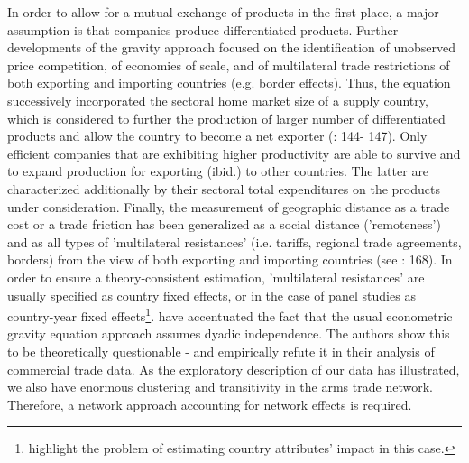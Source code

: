 \documentclass[12pt, letterpaper]{article}
\numberwithin{equation}{section}
\begin{document}
In order to allow for a mutual exchange of products in the first place, a major assumption is that companies produce differentiated products. Further developments of the gravity approach focused on the identification of unobserved price competition, of economies of scale, and of multilateral trade restrictions of both exporting and importing countries (e.g. border effects). Thus, the equation successively incorporated the sectoral home market size of a supply country, which is considered to further the production of larger number of differentiated products and allow the country to become a net exporter (\cite{Feenstra16}: 144- 147). Only efficient companies that are exhibiting higher productivity are able to survive and to expand production for exporting (ibid.) to other countries. The latter are characterized additionally by their sectoral total expenditures on the products under consideration. 
Finally, the measurement of geographic distance as a trade cost or a trade friction has been generalized as a social distance ('remoteness') and as all types of 'multilateral resistances' (i.e. tariffs, regional trade agreements, borders) from the view of both exporting and importing countries (see \cite{Feenstra16}: 168). In order to ensure a theory-consistent estimation, 'multilateral resistances' are usually specified as country fixed effects, or in the case of panel studies as country-year fixed effects\footnote{\cite{HeadMayer14} highlight the problem of estimating country attributes' impact in this case.}. \cite{WaAhAr:13} have accentuated the fact that the usual econometric gravity equation approach assumes dyadic independence. The authors show this to be theoretically questionable - and empirically refute it in their analysis of commercial trade data. 
As the exploratory description of our data has illustrated, we also have enormous clustering and transitivity in the arms trade network. Therefore, a network approach accounting for network effects is required. 
\end{document}

